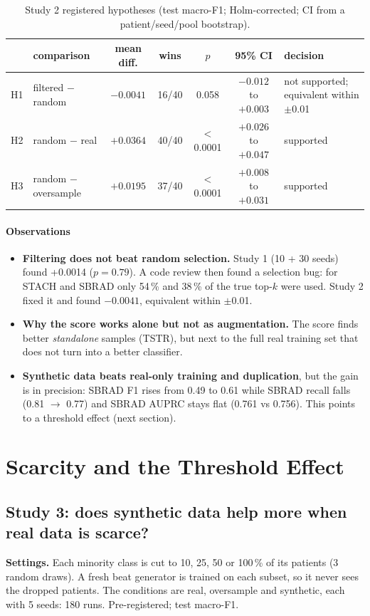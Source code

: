 \documentclass[11pt,a4paper]{article}
\newcommand{\obs}{\paragraph{Observations}}
\newcommand{\settings}[1]{\noindent\textbf{Settings.} #1\par\medskip}
\begin{document}
\begin{table}[H]\centering\small
\setlength{\tabcolsep}{4pt}\begin{tabular}{llccccp{3.0cm}}\toprule
 & comparison & mean diff. & wins & $p$ & 95\% CI & decision \\\midrule
H1 & filtered $-$ random & $-0.0041$ & 16/40 & 0.058 & $-0.012$ to $+0.003$ & not supported; equivalent within $\pm$0.01 \\
H2 & random $-$ real & $+0.0364$ & 40/40 & $<$0.0001 & $+0.026$ to $+0.047$ & supported \\
H3 & random $-$ oversample & $+0.0195$ & 37/40 & $<$0.0001 & $+0.008$ to $+0.031$ & supported \\\bottomrule
\end{tabular}
\caption[Study 2 registered hypotheses]{Study 2 registered hypotheses (test macro-F1; Holm-corrected; CI from a patient/seed/pool bootstrap).}
\end{table}

\obs
\begin{itemize}
\item \textbf{Filtering does not beat random selection.} Study 1 (10 + 30 seeds) found +0.0014 ($p=0.79$). A code
  review then found a selection bug: for STACH and SBRAD only 54\,\% and 38\,\% of the true top-$k$ were used. Study 2
  fixed it and found $-0.0041$, equivalent within $\pm$0.01.
\item \textbf{Why the score works alone but not as augmentation.} The score finds better \emph{standalone} samples
  (TSTR), but next to the full real training set that does not turn into a better classifier.
\item \textbf{Synthetic data beats real-only training and duplication}, but the gain is in precision: SBRAD F1 rises
  from 0.49 to 0.61 while SBRAD recall falls (0.81 $\rightarrow$ 0.77) and SBRAD AUPRC stays flat (0.761 vs 0.756).
  This points to a threshold effect (next section).
\end{itemize}

\section{Scarcity and the Threshold Effect}\label{sec:threshold}
\subsection{Study 3: does synthetic data help more when real data is scarce?}
\settings{Each minority class is cut to 10, 25, 50 or 100\,\% of its patients (3 random draws). A fresh beat
generator is trained on each subset, so it never sees the dropped patients. The conditions are real, oversample and
synthetic, each with 5 seeds: 180 runs. Pre-registered; test macro-F1.}
\end{document}
